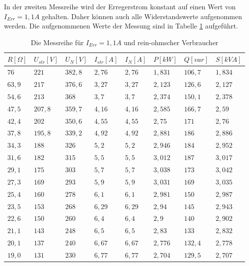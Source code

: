 \documentclass{report}
\begin{document}
In der zweiten Messreihe wird der Erregerstrom konstant auf einen Wert von $I_{Err} = 1,1A$ gehalten. Daher können auch alle Widerstandswerte aufgenommen werden. Die aufgenommenen Werte der Messung sind in Tabelle \ref{tab:ohm_messreihe_2} aufgeführt.
\begin{table}[!ht]
	\centering
	\begin{tabular}{llllllll}
		\hline
		$R [\Omega]$ & $U_{str} [V]$ & $U_{N} [V]$ & $I_{str} [A]$ & $I_{N} [A]$ & $P [kW]$ & $Q [var]$ & $S [kVA]$ \\ \hline
		$76$         & $221$         & $382,8$     & $2,76$        & $2,76$      & $1,831$  & $106,7$   & $1,834$   \\
		$63,9$       & $217$         & $376,6$     & $3,27$        & $3,27$      & $2,123$  & $126,6$   & $2,127$   \\
		$54,6$       & $213$         & $368$       & $3,7$         & $3,7$       & $2,374$  & $150,1$   & $2,378$   \\
		$47,5$       & $207,8$       & $359,7$     & $4,16$        & $4,16$      & $2,585$  & $166,7$   & $2,59$    \\
		$42,4$       & $202$         & $350,6$     & $4,55$        & $4,55$      & $2,75$   & $171$     & $2,76$    \\
		$37,8$       & $195,8$       & $339,2$     & $4,92$        & $4,92$      & $2,881$  & $186$     & $2,886$   \\
		$34,3$       & $188$         & $326$       & $5,2$         & $5,2$       & $2,946$  & $184$     & $2,952$   \\
		$31,6$       & $182$         & $315$       & $5,5$         & $5,5$       & $3,012$  & $187$     & $3,017$   \\
		$29,1$       & $175$         & $303$       & $5,7$         & $5,7$       & $3,038$  & $173$     & $3,042$   \\
		$27,3$       & $169$         & $293$       & $5,9$         & $5,9$       & $3,031$  & $169$     & $3,035$   \\
		$25,4$       & $160$         & $278$       & $6,1$         & $6,1$       & $2,981$  & $150$     & $2,987$   \\
		$23,5$       & $153$         & $268$       & $6,29$        & $6,29$      & $2,94$   & $145$     & $2,943$   \\
		$22,6$       & $150$         & $260$       & $6,4$         & $6,4$       & $2,9$    & $140$     & $2,902$   \\
		$21,1$       & $143$         & $248$       & $6,5$         & $6,5$       & $2,83$   & $133$     & $2,832$   \\
		$20,1$       & $137$         & $240$       & $6,67$        & $6,67$      & $2,776$  & $132,4$   & $2,778$   \\
		$19,0$       & $131$         & $230$       & $6,77$        & $6,77$      & $2,704$  & $129,5$   & $2,707$   \\ \hline
	\end{tabular}
	\label{tab:ohm_messreihe_2}
	\caption{Die Messreihe für $I_{Err} = 1,1A$ und rein-ohmscher Verbraucher}
\end{table}
\end{document}
